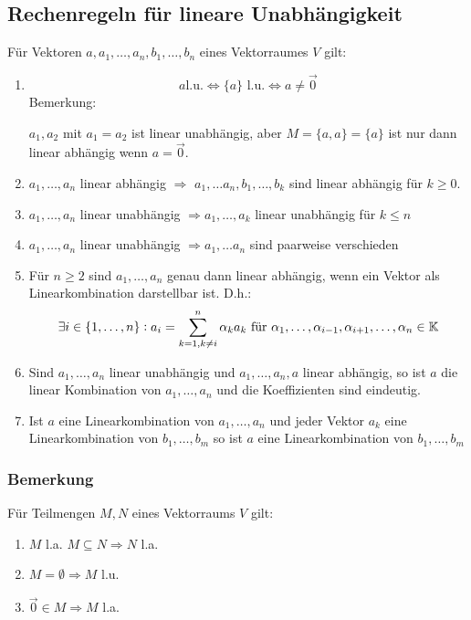 \subsection{Rechenregeln für lineare Unabhängigkeit}
Für Vektoren $a, a_1, \ldots, a_n, b_1, \ldots, b_n$ eines Vektorraumes $V$ gilt:
\begin{enumerate}[label = (\alph*)]
        \item
            \begin{equation*}
                a \text{l.u.} \Leftrightarrow \{a\} \text{ l.u.} \Leftrightarrow
                a \neq \vec{0}
            \end{equation*}
            Bemerkung:

            $a_1, a_2$ mit $a_1 = a_2$ ist linear unabhängig, aber $M=\{a, a\} =
            \{a\}$ ist nur dann linear abhängig wenn $a = \vec{0}$.
        \item
            $a_1, \ldots, a_n$ linear abhängig $\Rightarrow$ $a_1, \ldots a_n,
            b_1, \ldots, b_k$ sind linear abhängig für $k \geq 0$.
        \item $a_1, \ldots, a_n$ linear unabhängig $\Rightarrow a_1, \ldots, a_k$
            linear unabhängig für $k \leq n$
        \item $a_1, \ldots, a_n$ linear unabhängig $\Rightarrow a_1, \ldots a_n$
            sind paarweise verschieden
        \item Für $n \geq 2$ sind $a_1, \ldots, a_n$ genau dann linear abhängig,
            wenn ein Vektor als Linearkombination darstellbar ist. D.h.:
            \begin{equation*}
                \exists i \in \{1, \ldots, n\}: a_i = \sum_{k=1, k \neq i}^n
                \alpha_k a_k \text{ für } \alpha_1, \ldots, \alpha_{i-1},
                \alpha_{i+1}, \ldots, \alpha_n \in \mathbb{K}
            \end{equation*}
        \item Sind $a_1, \ldots, a_n$ linear unabhängig und $a_1, \ldots, a_n, a$
            linear abhängig, so ist $a$ die linear Kombination von $a_1, \ldots,
            a_n$ und die Koeffizienten sind eindeutig.
        \item Ist $a$ eine Linearkombination von $a_1, \ldots, a_n$ und jeder
            Vektor $a_k$ eine Linearkombination von $b_1, \ldots, b_m$ so ist
            $a$ eine Linearkombination von $b_1, \ldots, b_m$
\end{enumerate}

\subsubsection{Bemerkung}
Für Teilmengen $M, N$ eines Vektorraums $V$ gilt:
\begin{enumerate}[label= (\alph*)]
    \item $M$ l.a. $M \subseteq N \Rightarrow N$ l.a.
    \item $M=\emptyset \Rightarrow M$ l.u.
    \item $\vec{0} \in M \Rightarrow M$ l.a.
\end{enumerate}

